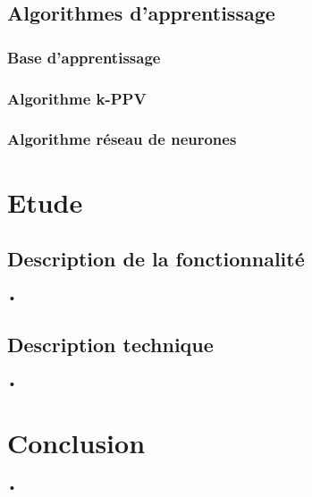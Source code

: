 \documentclass[10pt,a4paper]{report}
\begin{document}
\subsection{Algorithmes d'apprentissage}

\subsubsection{Base d'apprentissage}

\subsubsection{Algorithme k-PPV}

\subsubsection{Algorithme réseau de neurones}


\section{Etude}

\subsection{Description de la fonctionnalité}
\begin{flushleft}
•
\end{flushleft}

\subsection{Description technique}
\begin{flushleft}
•
\end{flushleft}



\section{Conclusion}
\begin{flushleft}
•
\end{flushleft}
\end{document}
